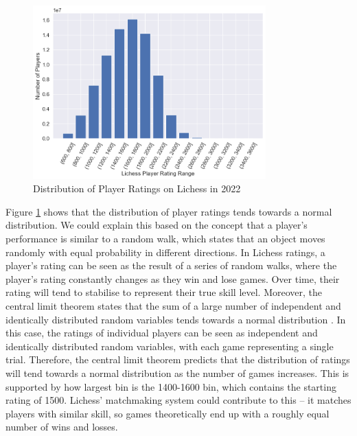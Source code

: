 \documentclass[a4paper, 11pt]{article}
\begin{document}
\begin{figure}[H]
    \centering
    \caption{Distribution of Player Ratings on Lichess in 2022}
    \label{fig:distributionOfPlayerRatings}
    \includegraphics[width=0.8\textwidth]{Distribution of Player Ratings.png}
\end{figure}

Figure \ref{fig:distributionOfPlayerRatings} shows that the distribution of player ratings tends towards a normal distribution. We could explain this based on the concept that a player's performance is similar to a random walk, which states that an object moves randomly with equal probability in different directions. In Lichess ratings, a player's rating can be seen as the result of a series of random walks, where the player's rating constantly changes as they win and lose games. Over time, their rating will tend to stabilise to represent their true skill level. Moreover, the central limit theorem states that the sum of a large number of independent and identically distributed random variables tends towards a normal distribution \cite{le1986central}. In this case, the ratings of individual players can be seen as independent and identically distributed random variables, with each game representing a single trial. Therefore, the central limit theorem predicts that the distribution of ratings will tend towards a normal distribution as the number of games increases. This is supported by how largest bin is the 1400-1600 bin, which contains the starting rating of 1500. Lichess' matchmaking system could contribute to this -- it matches players with similar skill, so games theoretically end up with a roughly equal number of wins and losses.
\end{document}
